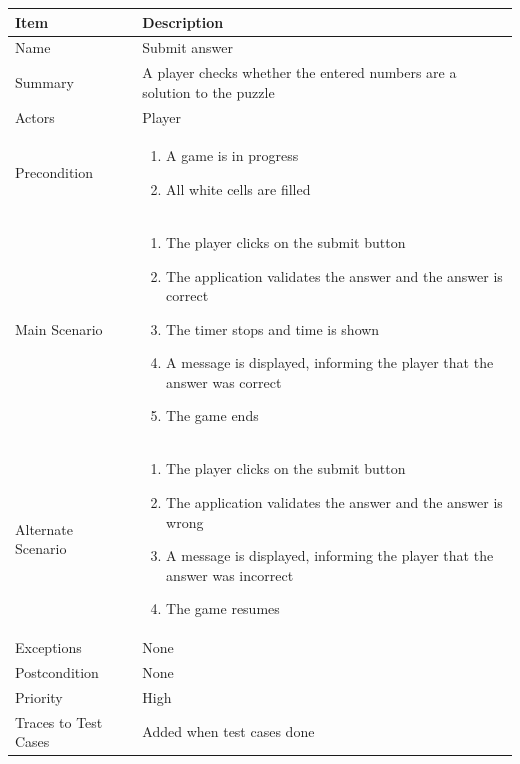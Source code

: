 \documentclass[12pt]{article}
\begin{document}
\begin{center}
\setlength{\tabcolsep}{16pt}
\renewcommand{\arraystretch}{1.1}
\begin{tabular}{ |p{3.4cm}|p{10cm}| }
    \hline
    \textbf{Item} & \textbf{Description} \\
    \hline
    Name & Submit answer \\
    \hline
    Summary & A player checks whether the entered numbers are a solution to the puzzle \\
    \hline
    Actors & Player \\
    \hline
    Precondition & 
    \vspace*{-0.1in}
    \begin{enumerate}[leftmargin=0.2in]
    \item A game is in progress
    \item All white cells are filled
    \end{enumerate}  \\
    \hline
    Main Scenario &     
    \vspace*{-0.1in}
    \begin{enumerate}[leftmargin=0.2in]
    \item The player clicks on the submit button
    \item The application validates the answer and the answer is correct
    \item The timer stops and time is shown
    \item A message is displayed, informing the player that the answer was correct
    \item The game ends
    \end{enumerate}  \\
    \hline
    Alternate Scenario & 
    \vspace*{-0.1in}
    \begin{enumerate}[leftmargin=0.2in]
    \item The player clicks on the submit button
    \item The application validates the answer and the answer is wrong
    \item A message is displayed, informing the player that the answer was incorrect
    \item The game resumes
    \end{enumerate}  \\
    \hline
    Exceptions &  None \\
    \hline
    Postcondition & None \\
    \hline
    Priority & High  \\
    \hline
    \small{Traces to Test Cases} & Added when test cases done  \\
    \hline
\end{tabular}
\end{center}
\end{document}
